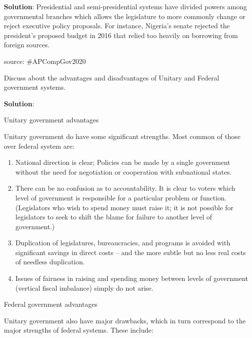 \documentclass[
]{book}
\newcommand{\question}{\item}
\newenvironment{solution}{ {\bfseries Solution}:}{}
\begin{document}
\begin{questions}
\begin{solution}
Presidential and semi-presidential systems have divided powers among governmental branches which allows the legislature to more commonly change or reject executive policy proposals. For instance, Nigeria's senate rejected the president's proposed budget in 2016 that relied too heavily on borrowing from foreign sources.

source: \#APCompGov2020
\end{solution}

\question Discuss about the advantages and disadvantages of Unitary and Federal government systems.

\begin{solution}

Unitary government advantages

Unitary government do have some significant strengths. Most common of those over federal system are:

\begin{enumerate}
\item National direction is clear; Policies can be made by a single government without the need for negotiation or cooperation with subnational states.
\item There can be no confusion as to accountability. It is clear to voters which level of government is responsible for a particular problem or function. (Legislators who wish to spend money must raise it; it is not possible for legislators to seek to shift the blame for failure to another level of government.)
\item Duplication of legislatures, bureaucracies, and programs is avoided with significant savings in direct costs -- and the more subtle but no less real costs of needless duplication.
\item Issues of fairness in raising and spending money between levels of government (vertical fiscal imbalance) simply do not arise.
\end{enumerate}

Federal government advantages

Unitary government also have major drawbacks, which in turn correspond to the major strengths of federal systems. These include:


\end{solution}
\end{questions}
\end{document}
